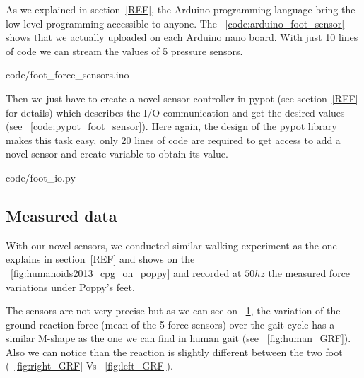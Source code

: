 As we explained in section~\ref{REF}, the Arduino programming language bring the low level programming accessible to anyone. The \codename~\ref{code:arduino_foot_sensor} shows that we actually uploaded on each Arduino nano board. With just 10 lines of code we can stream the values of 5 pressure sensors.


    {code/foot_force_sensors.ino}

Then we just have to create a novel sensor controller in pypot (see section~\ref{REF} for details) which describes the I/O communication and get the desired values (see \codename~\ref{code:pypot_foot_sensor}). Here again, the design of the pypot library makes this task easy, only 20 lines of code are required to get access to add a novel sensor and create variable to obtain its value.


    {code/foot_io.py}


\subsection{Measured data} %
With our novel sensors, we conducted similar walking experiment as the one explains in section~\ref{REF} and shows on the \figurename~\ref{fig:humanoids2013_cpg_on_poppy} and recorded at $50hz$ the measured force variations under Poppy's feet.

The sensors are not very precise but as we can see on \figurename~\ref{fig:poppy_GRF}, the variation of the ground reaction force (mean of the 5 force sensors) over the gait cycle has a similar M-shape as the one we can find in human gait (see \figurename~\ref{fig:human_GRF}). Also we can notice than the reaction is slightly different between the two foot (\figurename~\ref{fig:right_GRF} Vs \figurename~\ref{fig:left_GRF}).

\begin{figure}[!h]
\centering
    \hfil
    \caption{}
    \label{fig:poppy_GRF}
\end{figure}


